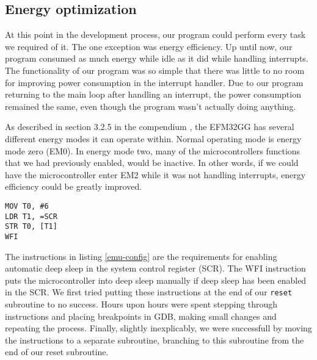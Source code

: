 \subsection{Energy optimization}
\label{sec:energy-optimization}

At this point in the development process, our program could perform every task we required of it. The one exception was energy efficiency. Up until now, our program consumed as much energy while idle as it did while handling interrupts. The functionality of our program was so simple that there was little to no room for improving power consumption in the interrupt handler. Due to our program returning to the main loop after handling an interrupt, the power consumption remained the same, even though the program wasn't actually doing anything.

As described in section 3.2.5 in the compendium \cite{compendium}, the EFM32GG has several different energy modes it can operate within. Normal operating mode is energy mode zero (EM0). In energy mode two, many of the microcontrollers functions that we had previously enabled, would be inactive. In other words, if we could have the microcontroller enter EM2 while it was not handling interrupts, energy efficiency could be greatly improved.

\begin{lstlisting}[label=emu-config, caption=Enabling automatic deep sleep after interrupt handling]
MOV T0, #6
LDR T1, =SCR
STR T0, [T1]
WFI
\end{lstlisting}

The instructions in listing \ref{emu-config} are the requirements for enabling automatic deep sleep in the system control register (SCR). The WFI instruction puts the microcontroller into deep sleep manually if deep sleep has been enabled in the SCR. We first tried putting these instructions at the end of our \texttt{reset} subroutine to no success. Hours upon hours were spent stepping through instructions and placing breakpoints in GDB, making small changes and repeating the process. Finally, slightly inexplicably, we were successfull by moving the instructions to a separate subroutine, branching to this subroutine from the end of our reset subroutine.
